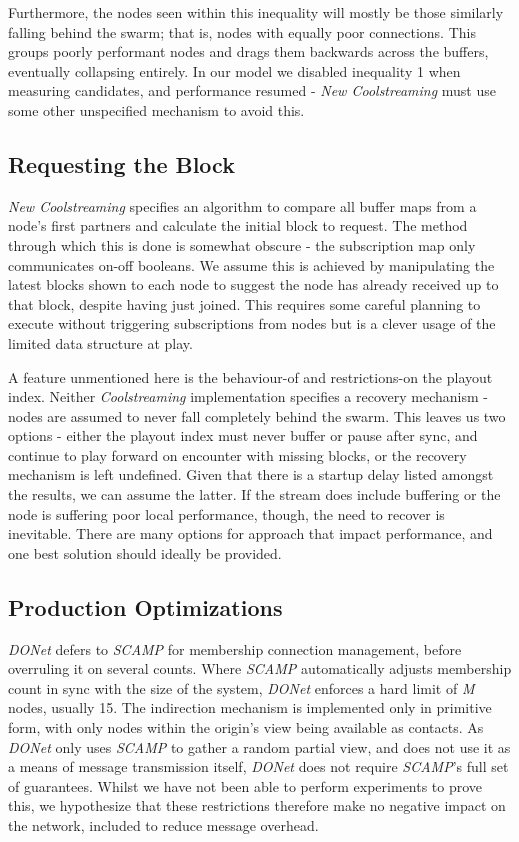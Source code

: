 \documentclass[12pt,a4paper]{article}
\begin{document}
Furthermore, the nodes seen within this inequality will mostly be those similarly falling behind the swarm; that is, nodes with equally poor connections. This groups poorly performant nodes and drags them backwards across the buffers, eventually collapsing entirely. In our model we disabled inequality 1 when measuring candidates, and performance resumed - \textit{New Coolstreaming} must use some other unspecified mechanism to avoid this.

\subsection{Requesting the Block}
\textit{New Coolstreaming} specifies an algorithm to compare all buffer maps from a node's first partners and calculate the initial block to request. The method through which this is done is somewhat obscure - the subscription map only communicates on-off booleans. We assume this is achieved by manipulating the latest blocks shown to each node to suggest the node has already received up to that block, despite having just joined. This requires some careful planning to execute without triggering subscriptions from nodes but is a clever usage of the limited data structure at play.

A feature unmentioned here is the behaviour-of and restrictions-on the playout index. Neither \textit{Coolstreaming} implementation specifies a recovery mechanism - nodes are assumed to never fall completely behind the swarm. This leaves us two options - either the playout index must never buffer or pause after sync, and continue to play forward on encounter with missing blocks, or the recovery mechanism is left undefined. Given that there is a startup delay listed amongst the results, we can assume the latter. If the stream does include buffering or the node is suffering poor local performance, though, the need to recover is inevitable. There are many options for approach that impact performance, and one best solution should ideally be provided.

\subsection{Production Optimizations}
\textit{DONet} defers to \textit{SCAMP} for membership connection management,  before overruling it on several counts. Where \textit{SCAMP} automatically adjusts membership count in sync with the size of the system, \textit{DONet} enforces a hard limit of \textit{M} nodes, usually 15. The indirection mechanism is implemented only in primitive form, with only nodes within the origin's view being available as contacts. As \textit{DONet} only uses \textit{SCAMP} to gather a random partial view, and does not use it as a means of message transmission itself, \textit{DONet} does not require \textit{SCAMP}'s full set of guarantees. Whilst we have not been able to perform experiments to prove this, we hypothesize that these restrictions therefore make no negative impact on the network, included to reduce message overhead.
\end{document}
